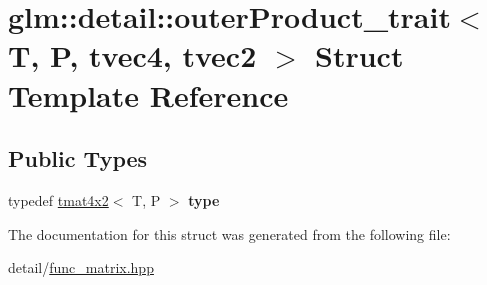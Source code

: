 \hypertarget{structglm_1_1detail_1_1outerProduct__trait_3_01T_00_01P_00_01tvec4_00_01tvec2_01_4}{\section{glm\-:\-:detail\-:\-:outer\-Product\-\_\-trait$<$ T, P, tvec4, tvec2 $>$ Struct Template Reference}
\label{structglm_1_1detail_1_1outerProduct__trait_3_01T_00_01P_00_01tvec4_00_01tvec2_01_4}
}
\subsection*{Public Types}
\begin{DoxyCompactItemize}
\item 
\hypertarget{structglm_1_1detail_1_1outerProduct__trait_3_01T_00_01P_00_01tvec4_00_01tvec2_01_4_a15cc3a28bd3e09c75a19ce0349c76d9a}{typedef \hyperlink{structglm_1_1tmat4x2}{tmat4x2}$<$ T, P $>$ {\bfseries type}}\label{structglm_1_1detail_1_1outerProduct__trait_3_01T_00_01P_00_01tvec4_00_01tvec2_01_4_a15cc3a28bd3e09c75a19ce0349c76d9a}

\end{DoxyCompactItemize}


The documentation for this struct was generated from the following file\-:\begin{DoxyCompactItemize}
\item 
detail/\hyperlink{func__matrix_8hpp}{func\-\_\-matrix.\-hpp}\end{DoxyCompactItemize}
